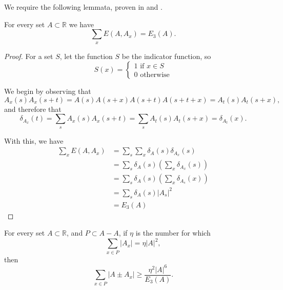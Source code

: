 \documentclass[12pt,reqno]{amsart}
\begin{document}
We require the following lemmata, proven in \cite{Schoen-lemma} and \cite{shkredov}.
\begin{lemma}
For every set \(A \subset \mathbb{R} \) we have
\[
    \sum _{x} E\left( A, A_{x}  \right) = E_{3} (A)
.\]
\end{lemma}

\begin{proof}
For a set \(S\), let the function \(S\) be the indicator function, so
\[S(x)= 
\begin{cases}
1 \text{ if } x \in S\\
0 \text{ otherwise}
\end{cases}
\]

We begin by observing that
\[
    A_{x} (s) A_{x} (s + t) = A(s) A(s + x) A(s + t) A(s+t+x) = A_{t} (s) A_{t} (s + x)
,\]
and therefore that
\[
    \delta_{A_{x} } (t) = \sum _{s} A_{x} (s) A_{x} (s + t) = \sum _{s} A_{t} (s) A_{t} (s + x) = \delta_{A_{t} } (x)
.\]

With this, we have
\begin{align*}
    \sum _{x} E(A,A_{x} )& = \sum _{s} \sum _{x} \delta_{A} (s) \delta_{A_{x} } (s)\\
    & = \sum _{s} \delta_{A} (s) \left( \sum _{x} \delta_{A_{x} } (s) \right) \\
    & = \sum _{s} \delta_{A} (s) \left( \sum _{x}  \delta_{A_{s} } (x) \right) \\
    & = \sum _{s} \delta_{A} (s) \left\lvert A_{s}  \right\rvert ^{2}\\
    & = E_{3} (A)
\end{align*}

\end{proof}

\begin{lemma}\label{lem:shkredov-main-lem}
For every set \(A \subset \mathbb{R} \), and \(P \subset A - A\), if \(\eta\) is the number for which
\[
    \sum _{x \in P} \left\lvert A_{x}  \right\rvert = \eta \left\lvert A \right\rvert ^{2}
,\]
then
\[
    \sum _{x \in P} \left\lvert A \pm A_{x}  \right\rvert \geq \frac{\eta ^{2} \left\lvert A \right\rvert ^{6}}{E_{3} (A)} 
.\]
\end{lemma}
\end{document}
